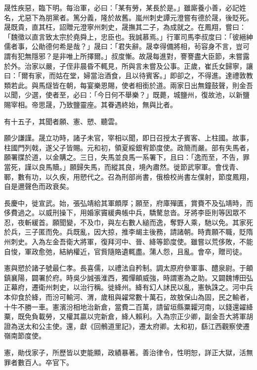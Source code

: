 \begin{pinyinscope}
 晟性疾惡，臨下明。每治軍，必曰：「某有勞，某長於是。」雖廝養小善，必記姓名，尤惡下為朋黨者。篤分義，隆於故舊。嵐州刺史譚元澄嘗有德於晟，後貶死。晟既貴，直其枉，詔贈元澄寧州刺史，晟撫其二子，為成就之。在鳳翔，嘗曰：「魏徵以直言致太宗於堯舜上，忠臣也。我誠慕焉。」行軍司馬李叔度曰：「彼縉紳儒者事，公勛德何希是哉？」晟曰：「君失辭。晟幸得備將相，茍容身不言，豈可謂有犯無隱邪？是非唯上所擇爾。」叔度慚。故晟每進對，謇謇盡大臣節，未嘗露於外。治家以嚴，子侄非晨昏不輒見，所與言未嘗及公事。正歲，崔氏女歸寧，讓曰：「爾有家，而姑在堂，婦當治酒食，且以待賓客。」即卻之，不得進。達禮敦教類若此。與馬燧皆在朝，每宴樂恩賜，使者相銜於道。兩家日出無鐘鼓聲，則金吾以聞，少選，使者至，必曰：「今日何不舉樂？」既薨，城鹽州，復故池，以新鹽賜宰相。帝思晟，乃致鹽靈座。其眷遇終始，無與比者。



 有十五子，其聞者願、憲、愬、聽雲。



 願少謙謹。晟立功時，諸子未官，宰相以聞，即日召授太子賓客、上柱國。故事，柱國門列戟，遂父子皆賜。元和初，領夏綏銀宥節度使。政簡而嚴。部有失馬者，願署牒於道，以金購之。三日，失馬並良馬一系署下，且曰：「逸而至，不告，罪當死，謹以良馬贖。」願歸失馬，而縱其良，境內肅然。徙節武寧軍。會伐青、鄆，數有功，以久疾，用愬代之。召為刑部尚書，俄檢校尚書左僕射，節度鳳翔，自是邇聲色而政衰矣。



 長慶中，徙宣武。始，張弘靖給其軍頗厚；願至，府庫殫匱，賞賚不及弘靖時，而侈費過之。以威刑操下，用婚家竇緩典帳中兵，驕驁怠沓。牙將李臣則等因眾不忍，夜斬緩首。願聞變，不及巾，與左右數人縋而逸，奪野人乘，馳以免。其家死於兵，三子匿而免。兵既亂，因大掠，推李朅主後務，請諸朝。時責願不職，貶隋州刺史。入為左金吾衛大將軍，復拜河中、晉、絳等節度使。雖嘗以荒侈敗，不能自悛，軍政愈弛，結納權近，官貲隨賂遺輒盡。蒲人怨，且亂。會卒，贈司徒。



 憲與愬於諸子號最仁孝。長喜儒，以禮法自矜制。調太原府參軍事、醴泉尉。于頔鎮襄陽，闢署於府。時吳少誠張淮西，獨憚頔威強，時謂憲為之助。又闢魏博田弘正幕府，遷衛州刺史，以治行稱。徙絳州。絳有幻人訹民以亂，憲執誅之。河中兵本仰食於絳，而汾可輸河、渭，歲租與糴常數十萬石，故敖保山為固，民之輸者，十牛不勝一車。憲濱汾相地治新倉，當費二百萬，請留垣縣粟糶河南，以錢還糴絳粟，既免負載勞，又權其贏以完新倉，絳人賴利。入為宗正少卿，副金吾大將軍胡證為送太和公主使。還，獻《回鶻道里記》，遷太府卿。太和初，繇江西觀察使遷嶺南節度使。



 憲，勛伐家子，所歷皆以吏能顯，政績暴著。善治律令，性明恕，詳正大獄，活無罪者數百人。卒官下。




\end{pinyinscope}
